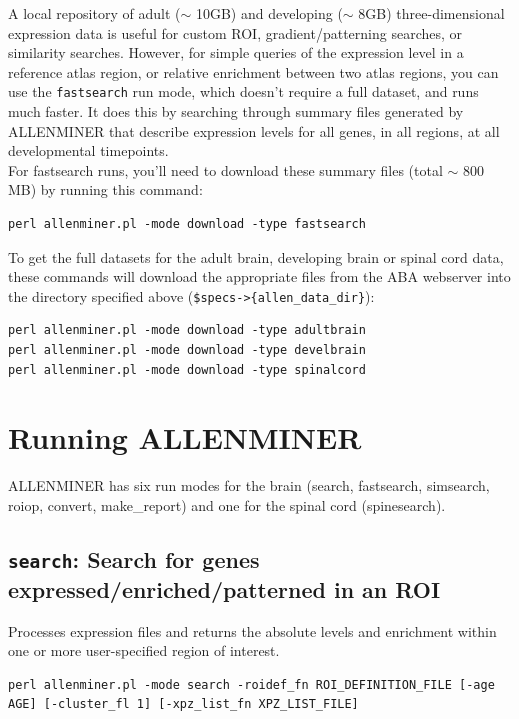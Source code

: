 \documentclass[10pt]{article}
\begin{document}
A local repository of adult ($\sim$ 10GB) and developing ($\sim$ 8GB) three-dimensional expression data is useful for custom ROI, gradient/patterning searches, or similarity searches. However, for simple queries of the expression level in a reference atlas region, or relative enrichment between two atlas regions, you can use the {\tt fastsearch} run mode, which doesn't require a full dataset, and runs much faster. It does this by searching through summary files generated by ALLENMINER that describe expression levels for all genes, in all regions, at all developmental timepoints.\\

For fastsearch runs, you'll need to download these summary files (total $\sim$ 800 MB) by running this command:
\lstset{breaklines=true,language=bash}
\lstset{frame=single}
\lstset{basicstyle=\ttfamily}
\begin{lstlisting}
perl allenminer.pl -mode download -type fastsearch
\end{lstlisting}

To get the full datasets for the adult brain, developing brain or spinal cord data, these commands will download the appropriate files from the ABA webserver into the directory specified above ({\tt \$specs->\{allen\_data\_dir\}}):
\lstset{breaklines=true,language=bash}
\lstset{frame=single}
\lstset{basicstyle=\ttfamily}
\begin{lstlisting}
perl allenminer.pl -mode download -type adultbrain
perl allenminer.pl -mode download -type develbrain
perl allenminer.pl -mode download -type spinalcord
\end{lstlisting}

\section{Running ALLENMINER}
ALLENMINER has six run modes for the brain (search, fastsearch, simsearch, roiop, convert, make\_report) and  one for the spinal cord (spinesearch).

\subsection{{\tt search}: Search for genes expressed/enriched/patterned in an ROI}

Processes expression files and returns the absolute levels and enrichment within one or more user-specified region of interest.\\

\begin{lstlisting}
perl allenminer.pl -mode search -roidef_fn ROI_DEFINITION_FILE [-age AGE] [-cluster_fl 1] [-xpz_list_fn XPZ_LIST_FILE]
\end{lstlisting}
\end{document}
